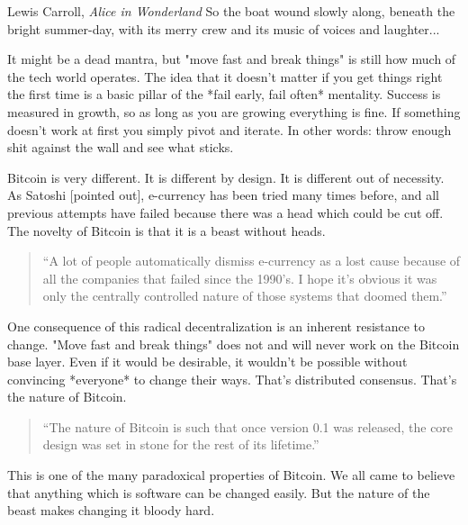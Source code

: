 \label{les:18}

\begin{chapquote}{Lewis Carroll, \textit{Alice in Wonderland}}
So the boat wound slowly along, beneath the bright summer-day, with its merry crew and its music of voices and laughter...
\end{chapquote}

It might be a dead mantra, but "move fast and break things" is still how
much of the tech world operates. The idea that it doesn't matter if you
get things right the first time is a basic pillar of the *fail early,
fail often* mentality. Success is measured in growth, so as long as you
are growing everything is fine. If something doesn't work at first you
simply pivot and iterate. In other words: throw enough shit against the
wall and see what sticks.

Bitcoin is very different. It is different by design. It is different
out of necessity. As Satoshi [pointed out], e-currency has been tried
many times before, and all previous attempts have failed because there
was a head which could be cut off. The novelty of Bitcoin is that it is
a beast without heads.

\begin{quotation}
``A lot of people automatically dismiss e-currency as a lost cause
because of all the companies that failed since the 1990's. I hope it's
obvious it was only the centrally controlled nature of those systems
that doomed them.''
\end{quotation}

One consequence of this radical decentralization is an inherent
resistance to change. "Move fast and break things" does not and will
never work on the Bitcoin base layer. Even if it would be desirable, it
wouldn't be possible without convincing *everyone* to change their ways.
That's distributed consensus. That's the nature of Bitcoin.

\begin{quotation}
``The nature of Bitcoin is such that once version 0.1 was released, the
core design was set in stone for the rest of its lifetime.''
\end{quotation}

This is one of the many paradoxical properties of Bitcoin. We all came
to believe that anything which is software can be changed easily. But
the nature of the beast makes changing it bloody hard.

